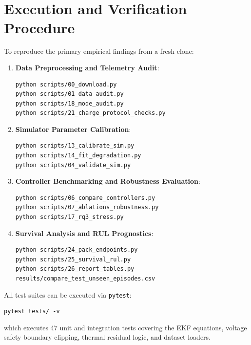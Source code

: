 \section{Execution and Verification Procedure}

To reproduce the primary empirical findings from a fresh clone:

\begin{enumerate}
  \item \textbf{Data Preprocessing and Telemetry Audit}:
\begin{verbatim}
python scripts/00_download.py
python scripts/01_data_audit.py
python scripts/18_mode_audit.py
python scripts/21_charge_protocol_checks.py
\end{verbatim}

  \item \textbf{Simulator Parameter Calibration}:
\begin{verbatim}
python scripts/13_calibrate_sim.py
python scripts/14_fit_degradation.py
python scripts/04_validate_sim.py
\end{verbatim}

  \item \textbf{Controller Benchmarking and Robustness Evaluation}:
\begin{verbatim}
python scripts/06_compare_controllers.py
python scripts/07_ablations_robustness.py
python scripts/17_rq3_stress.py
\end{verbatim}

  \item \textbf{Survival Analysis and RUL Prognostics}:
\begin{verbatim}
python scripts/24_pack_endpoints.py
python scripts/25_survival_rul.py
python scripts/26_report_tables.py results/compare_test_unseen_episodes.csv
\end{verbatim}
\end{enumerate}

All test suites can be executed via \texttt{pytest}:
\begin{verbatim}
pytest tests/ -v
\end{verbatim}
which executes 47 unit and integration tests covering the EKF equations,
voltage safety boundary clipping, thermal residual logic, and dataset
loaders.
